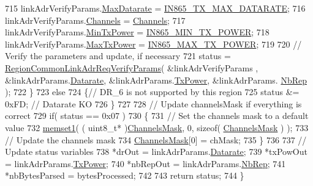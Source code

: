 \begin{DoxyCode}
715         linkAdrVerifyParams.\mbox{\hyperlink{structs_region_common_link_adr_req_verify_params_af426381985228a55dc22b90441f49c4c}{MaxDatarate}} = \mbox{\hyperlink{group___r_e_g_i_o_n_i_n865_ga927945116c9bf6917614b894d45c0972}{IN865\_TX\_MAX\_DATARATE}};
716         linkAdrVerifyParams.\mbox{\hyperlink{structs_region_common_link_adr_req_verify_params_afecbd1e457cbd79eb7072bd140ff33d4}{Channels}} = \mbox{\hyperlink{_region_i_n865_8c_adad6dcb99199b5142166021a8aac9aa2}{Channels}};
717         linkAdrVerifyParams.\mbox{\hyperlink{structs_region_common_link_adr_req_verify_params_afe7bf10e9fadd8be6beb31e8b91a1ba2}{MinTxPower}} = \mbox{\hyperlink{group___r_e_g_i_o_n_i_n865_ga91b8f9bdc09d452a2e6bbbad95544245}{IN865\_MIN\_TX\_POWER}};
718         linkAdrVerifyParams.\mbox{\hyperlink{structs_region_common_link_adr_req_verify_params_a118829b26fb7d913d4202d5d06356a95}{MaxTxPower}} = \mbox{\hyperlink{group___r_e_g_i_o_n_i_n865_ga6bd515d7c4fbad47210702da1d9396a3}{IN865\_MAX\_TX\_POWER}};
719 
720         \textcolor{comment}{// Verify the parameters and update, if necessary}
721         status = \mbox{\hyperlink{group___r_e_g_i_o_n_c_o_m_m_o_n_ga2c87f98f09793dc7fa63a9801feeed73}{RegionCommonLinkAdrReqVerifyParams}}( &linkAdrVerifyParams
      , &linkAdrParams.\mbox{\hyperlink{structs_region_common_link_adr_params_ae2f6080f3aa0e9485c55513ca56bb24d}{Datarate}}, &linkAdrParams.\mbox{\hyperlink{structs_region_common_link_adr_params_a037b4f849fa8ed4aa1d3c58aef2b28ec}{TxPower}}, &linkAdrParams.
      \mbox{\hyperlink{structs_region_common_link_adr_params_a3b99538671d86dbfe2f6754ce6f9577a}{NbRep}} );
722     \}
723     \textcolor{keywordflow}{else}
724     \{\textcolor{comment}{// DR\_6 is not supported by this region}
725         status &= 0xFD; \textcolor{comment}{// Datarate KO}
726     \}
727 
728     \textcolor{comment}{// Update channelsMask if everything is correct}
729     \textcolor{keywordflow}{if}( status == 0x07 )
730     \{
731         \textcolor{comment}{// Set the channels mask to a default value}
732         \mbox{\hyperlink{utilities_8c_a272ed6d691263d9762c98ed720b1fa3a}{memset1}}( ( uint8\_t* )\mbox{\hyperlink{_region_i_n865_8c_a2188957b5ca6af8092154d7ccbfa5757}{ChannelsMask}}, 0, \textcolor{keyword}{sizeof}( 
      \mbox{\hyperlink{_region_i_n865_8c_a2188957b5ca6af8092154d7ccbfa5757}{ChannelsMask}} ) );
733         \textcolor{comment}{// Update the channels mask}
734         \mbox{\hyperlink{_region_i_n865_8c_a2188957b5ca6af8092154d7ccbfa5757}{ChannelsMask}}[0] = chMask;
735     \}
736 
737     \textcolor{comment}{// Update status variables}
738     *drOut = linkAdrParams.\mbox{\hyperlink{structs_region_common_link_adr_params_ae2f6080f3aa0e9485c55513ca56bb24d}{Datarate}};
739     *txPowOut = linkAdrParams.\mbox{\hyperlink{structs_region_common_link_adr_params_a037b4f849fa8ed4aa1d3c58aef2b28ec}{TxPower}};
740     *nbRepOut = linkAdrParams.\mbox{\hyperlink{structs_region_common_link_adr_params_a3b99538671d86dbfe2f6754ce6f9577a}{NbRep}};
741     *nbBytesParsed = bytesProcessed;
742 
743     \textcolor{keywordflow}{return} status;
744 \}
\end{DoxyCode}
